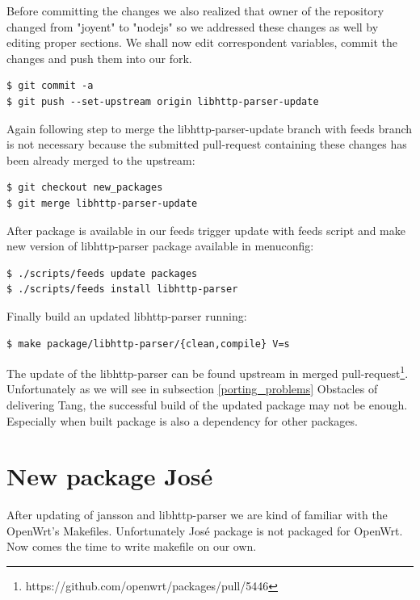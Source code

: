 Before committing the changes we also realized that owner of the repository changed from "joyent" to "nodejs" so we addressed these changes as well by editing proper sections.
We shall now edit correspondent variables, commit the changes and push them into our fork.
\begin{lstlisting}[columns=fixed,basicstyle=\ttfamily\footnotesize,tabsize=4,backgroundcolor=\color{yellow!10}]
$ git commit -a
$ git push --set-upstream origin libhttp-parser-update
\end{lstlisting}
Again following step to merge the libhttp-parser-update branch with feeds branch is not necessary because the submitted pull-request containing these changes has been already merged to the upstream:
\begin{lstlisting}[columns=fixed,basicstyle=\ttfamily\footnotesize,tabsize=4,backgroundcolor=\color{yellow!10}]
$ git checkout new_packages
$ git merge libhttp-parser-update
\end{lstlisting}
After package is available in our feeds trigger update with feeds script and make new version of libhttp-parser package available in menuconfig:
\begin{lstlisting}[columns=fixed,basicstyle=\ttfamily\footnotesize,tabsize=4,backgroundcolor=\color{yellow!10}]
$ ./scripts/feeds update packages
$ ./scripts/feeds install libhttp-parser
\end{lstlisting}
Finally build an updated libhttp-parser running:
\begin{lstlisting}[columns=fixed,basicstyle=\ttfamily\footnotesize,tabsize=4,backgroundcolor=\color{yellow!10}]
$ make package/libhttp-parser/{clean,compile} V=s
\end{lstlisting}
The update of the libhttp-parser can be found upstream in merged pull-request\footnote{https://github.com/openwrt/packages/pull/5446}.
Unfortunately as we will see in subsection \ref{porting_problems} Obstacles of delivering Tang, the successful build of the updated package may not be enough.
Especially when built package is also a dependency for other packages.



\section{New package José}

After updating of jansson and libhttp-parser we are kind of familiar with the OpenWrt's Makefiles.
Unfortunately José package is not packaged for OpenWrt.
Now comes the time to write makefile on our own.

